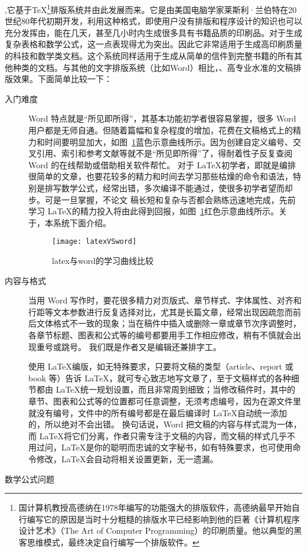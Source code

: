 ,它基于\TeX\footnote{国计算机教授高德纳在1978年编写的功能强大的排版软件，高德纳最早开始自行编写它的原因是当时十分粗糙的排版水平已经影响到他的巨著《计算机程序设计艺术》（The Art of Computer Programming）的印刷质量。他以典型的黑客思维模式，最终决定自行编写一个排版软件。}排版系统并由此发展而来。它是由美国电脑学家莱斯利·兰伯特在20世纪80年代初期开发，利用这种格式，即使用户没有排版和程序设计的知识也可以充分发挥由，能在几天，甚至几小时内生成很多具有书籍品质的印刷品。对于生成复杂表格和数学公式，这一点表现得尤为突出。因此它非常适用于生成高印刷质量的科技和数学类文档。这个系统同样适用于生成从简单的信件到完整书籍的所有其他种类的文档。与其他的文字排版系统（比如Word）相比，、高专业水准的文稿排版效果。下面简单比较一下：
\begin{description}
\item[入门难度]  Word 特点就是“所见即所得”，其基本功能初学者很容易掌握，很多 Word 用户都是无师自通。但随着篇幅和复杂程度的增加，花费在文稿格式上的精力和时间要明显加大，如图~\ref{fig:xfig2}蓝色示意曲线所示。因为创建自定义编号、交叉引用、索引和参考文献等就不是“所见即所得”了，得耐着性子反复查阅 Word 的在线帮助或借助相关软件帮忙。
对于 \LaTeX 初学者，即就是编排很简单的文章，也要花较多的精力和时间去学习那些枯燥的命令和语法，特别是排写数学公式，经常出错，多次编译不能通过，使很多初学者望而却步。可是一旦掌握，不论文 稿长短和复杂与否都会熟练迅速地完成，先前学习 \LaTeX 的精力投入将由此得到回报，如图~\ref{fig:xfig2}红色示意曲线所示。关于，本系统下面介绍。
\begin{figure}[H]
  \centering
  \texttt{[image: latexVSword]}
  \caption{latex与word的学习曲线比较}
  \label{fig:xfig2}
\end{figure}
\item[内容与格式] 当用 Word 写作时，要花很多精力对页版式、章节样式、字体属性、对齐和行距等文本参数进行反复选择对比，尤其是长篇文章，经常出现因疏忽而前后文体格式不一致的现象；当在稿件中插入或删除一章或章节次序调整时，各章节标题、图表和公式等的编号都要用手工作相应修改，稍有不慎就会出现重号或跳号。 我们既是作者又是编辑还兼排字工。

使用 \LaTeX 编版，如无特殊要求，只要将文稿的类型（article、report 或 book 等）告诉 \LaTeX，就可专心致志地写文章了，至于文稿样式的各种细节都由 \LaTeX 统一规划设置，而且非常周到细致；当修改稿件时，其中的章节、图表和公式等的位置都可任意调整，无须考虑编号，因为在源文件里就没有编号，文件中的所有编号都是在最后编译时 \LaTeX 自动统一添加的，所以绝对不会出错。
换句话说，Word 把文稿的内容与样式混为一体，而 \LaTeX 将它们分离，作者只需专注于文稿的内容，而文稿的样式几乎不用过问，\LaTeX 是你的聪明而忠诚的文字秘书，如有特殊要求，也可使用命令修改，\LaTeX 会自动将相关设置更新，无一遗漏。
\item[数学公式问题] 


\end{description}
